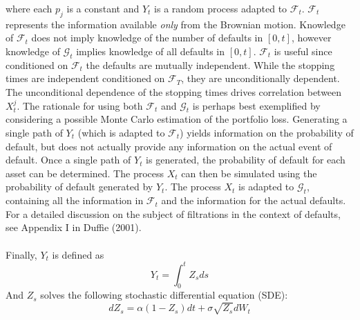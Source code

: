 \documentclass[12pt]{article}
\theoremstyle{definition}
\begin{document}
where each \(p_j\) is a constant and \(Y_t\) is a random process adapted to \(\mathcal{F}_t\).  \(\mathcal{F}_t\) represents the information available \emph{only} from the Brownian motion.  Knowledge of \(\mathcal{F}_t\) does not imply knowledge of the number of defaults in \([0,t]\), however knowledge of \(\mathcal{G}_t\) implies knowledge of all defaults in \([0, t]\).  \(\mathcal{F}_t\) is useful since conditioned on \(\mathcal{F}_t\) the defaults are mutually independent.  While the stopping times are independent conditioned on \(\mathcal{F}_T\), they are unconditionally dependent.  The unconditional dependence of the stopping times drives correlation between \(X_t ^ j\).  The rationale for using both \(\mathcal{F}_t\) and \(\mathcal{G}_t\) is perhaps best exemplified by considering a possible Monte Carlo estimation of the portfolio loss.  Generating a single path of \(Y_t\) (which is adapted to \(\mathcal{F}_t\)) yields information on the probability of default, but does not actually provide any information on the actual event of default.  Once a single path of \(Y_t\) is generated, the probability of default for each asset can be determined.  The process \(X_t\) can then be simulated using the probability of default generated by \(Y_t\). The process \(X_t\) is adapted to \(\mathcal{G}_t\), containing all the information in \(\mathcal{F}_t\) and the information for the actual defaults.  For a detailed discussion on the subject of filtrations in the context of defaults, see Appendix I in  Duffie (2001).    
\\
\\
Finally, 
\(Y_t\) is defined as \begin{equation} Y_t= \int_0 ^t Z_s ds\end{equation}
And \(Z_s\) solves the following stochastic differential equation (SDE):
\begin{equation} \label{sde} dZ_s=\alpha(1-Z_s)dt+\sigma \sqrt{Z_s} dW_t \end{equation}
\end{document}

